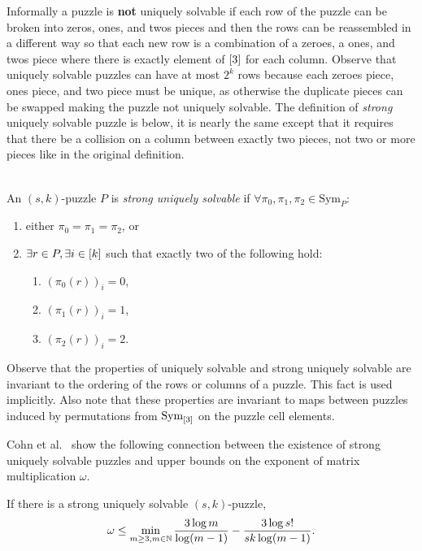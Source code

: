 \documentclass[11pt]{article}
\newcommand\Sym[1]{\ensuremath{\mathrm{Sym}_{#1}}}
\begin{document}
Informally a puzzle is \textbf{not} uniquely solvable if each row of
the puzzle can be broken into zeros, ones, and twos pieces and then
the rows can be reassembled in a different way so that each new row is
a combination of a zeroes, a ones, and twos piece where there is
exactly element of $[3]$ for each column.  Observe that uniquely
solvable puzzles can have at most $2^k$ rows because each zeroes
piece, ones piece, and two piece must be unique, as otherwise the
duplicate pieces can be swapped making the puzzle not uniquely
solvable.  The definition of \emph{strong} uniquely solvable puzzle is
below, it is nearly the same except that it requires that there be a
collision on a column between exactly two pieces, not two or more
pieces like in the original definition.

\begin{definition}
  ~\\
  An $(s,k)$-puzzle $P$ is \emph{strong uniquely solvable} if
  $\forall \pi_0, \pi_1, \pi_2 \in \Sym{P}:$
  \begin{enumerate}
  \item either $\pi_0 = \pi_1 = \pi_2$, or
  \item $\exists r \in P, \exists i \in [k]$ such that exactly two
    of the following hold:
    \begin{enumerate}
    \item $(\pi_0(r))_i = 0$,
    \item $(\pi_1(r))_i = 1$,
    \item $(\pi_2(r))_i = 2$.
    \end{enumerate}
  \end{enumerate}
  
\end{definition}

Observe that the properties of uniquely solvable and strong uniquely
solvable are invariant to the ordering of the rows or columns of a
puzzle.  This fact is used implicitly.  Also note that these
properties are invariant to maps between puzzles induced by
permutations from \Sym{\ordset{3}} on the puzzle cell elements.

Cohn et al.~ show the following connection between the existence of
strong uniquely solvable puzzles and upper bounds on the exponent of
matrix multiplication $\omega$.

\begin{lemma}
  If there is a strong uniquely solvable $(s,k)$-puzzle,
  $$\omega \le \min_{m \ge 3, m \in \mathbb{N}} \frac{3 \log
    m}{\log(m-1)} - \frac{3 \log s!}{sk \log(m-1)}.$$
\end{lemma}
\end{document}
